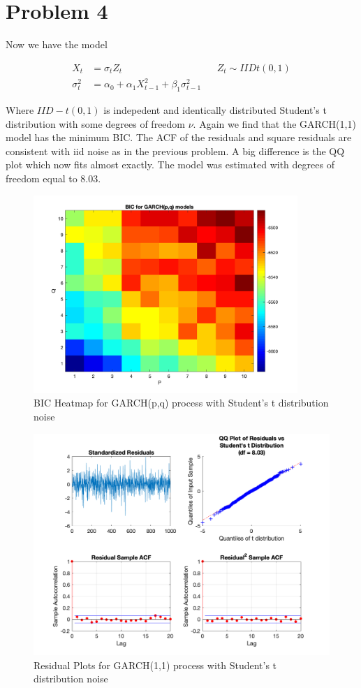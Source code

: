 \documentclass{article}
\begin{document}
\section*{Problem 4}

Now we have the model

\begin{align*}
X_t &= \sigma_t Z_t && Z_t \sim IIDt(0, 1)\\
\sigma_t^2 &= \alpha_0 + \alpha_1 X_{t - 1}^2 + \beta_1 \sigma_{t - 1}^2
\end{align*}

Where $IID-t(0,1)$ is indepedent and identically distributed Student's t distribution with some degrees of freedom $\nu$.
Again we find that the GARCH(1,1) model has the minimum BIC.
The ACF of the residuals and square residuals are consistent with iid noise as in the previous problem.
A big difference is the QQ plot which now fits almost exactly.
The model was estimated with degrees of freedom equal to 8.03.

\begin{figure}[H]
\includegraphics[width=10cm]{plots/bic_heatmap_t.png}
\centering
\caption{BIC Heatmap for GARCH(p,q) process with Student's t distribution noise}
\label{fig:bic_heatmap_t}
\end{figure}

\begin{figure}[H]
\includegraphics[width=16cm]{plots/residual_plots_t.png}
\centering
\caption{Residual Plots for GARCH(1,1) process with Student's t distribution noise}
\label{fig:residual_plots_t}
\end{figure}
\end{document}
